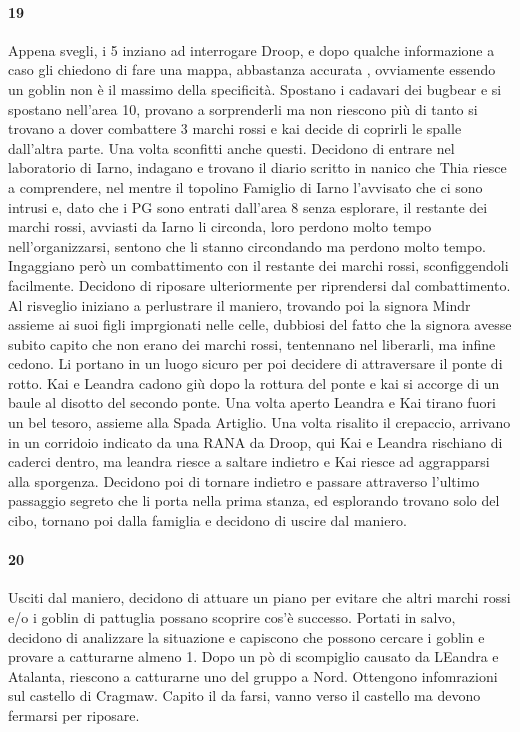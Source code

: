 \documentclass{article}
\begin{document}
                      \paragraph{19}
    Appena svegli, i 5 inziano ad interrogare Droop, e dopo qualche informazione a caso gli chiedono di fare una mappa, abbastanza accurata , ovviamente essendo un goblin non è il massimo della specificità. Spostano i cadavari dei bugbear e si spostano nell'area 10, provano a sorprenderli ma non riescono più di tanto si trovano a dover combattere 3 marchi rossi e kai decide di coprirli le spalle dall'altra parte. 
    Una volta sconfitti anche questi. Decidono di entrare nel laboratorio di Iarno, indagano e trovano il diario scritto in nanico che Thia riesce a comprendere, nel mentre il topolino Famiglio di Iarno l'avvisato che ci sono intrusi e, dato che i PG sono entrati dall'area 8 senza esplorare, il restante dei marchi rossi, avviasti da Iarno li circonda, loro perdono molto tempo nell'organizzarsi, sentono che li stanno circondando ma perdono molto tempo. Ingaggiano però un combattimento con il restante dei marchi rossi, sconfiggendoli facilmente.  Decidono di riposare ulteriormente per riprendersi dal combattimento. Al risveglio iniziano a perlustrare il maniero, trovando
    poi la signora Mindr assieme ai suoi figli imprgionati nelle celle, dubbiosi del fatto che la signora avesse subito capito che non erano dei marchi rossi, tentennano nel liberarli, ma infine cedono. Li portano in un luogo sicuro per poi decidere di attraversare il ponte di rotto. Kai e Leandra cadono giù dopo la rottura del ponte e kai si accorge di un baule al disotto del secondo ponte. Una volta aperto Leandra e Kai tirano fuori un bel tesoro, assieme alla Spada Artiglio. Una volta risalito il crepaccio, arrivano in un corridoio indicato da una RANA da Droop, qui Kai e Leandra rischiano di caderci dentro, ma leandra riesce a saltare indietro e Kai riesce ad aggrapparsi alla sporgenza. Decidono poi di tornare indietro e passare attraverso l'ultimo passaggio segreto che li porta nella prima stanza, ed esplorando trovano solo del cibo, tornano poi dalla famiglia e decidono di uscire dal maniero.
                      \paragraph{20}
    Usciti dal maniero, decidono di attuare un piano per evitare che altri marchi rossi e/o i goblin di pattuglia possano scoprire cos'è successo. Portati in salvo, decidono di analizzare la situazione e capiscono che possono cercare i goblin e provare a catturarne almeno 1. Dopo un pò di scompiglio causato da LEandra e Atalanta, riescono a catturarne uno del gruppo a Nord. Ottengono infomrazioni sul castello di Cragmaw. Capito il da farsi, vanno verso il castello ma devono fermarsi per riposare.
\end{document}

